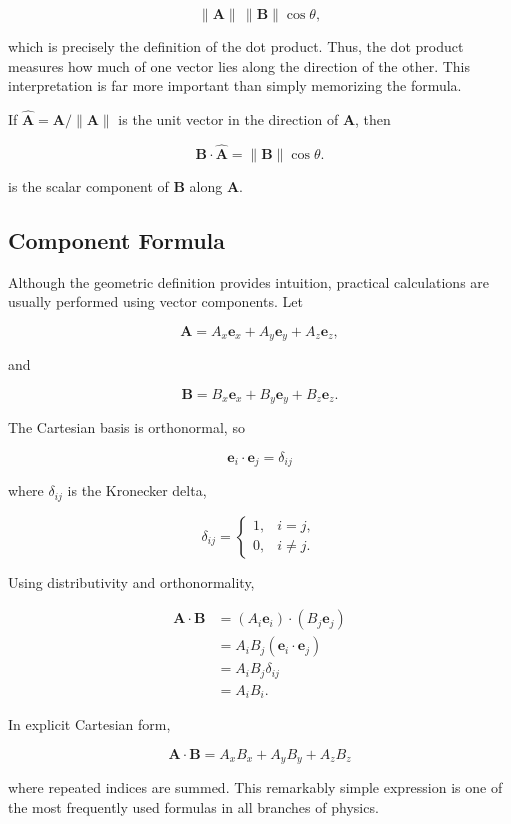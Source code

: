 \[
\lVert\mathbf A\rVert\,\lVert\mathbf B\rVert\cos\theta,
\]

which is precisely the definition of the dot product. Thus, the dot product
measures how much of one vector lies along the direction of the other. This
interpretation is far more important than simply memorizing the formula.

If $\widehat{\mathbf A}=\mathbf A/\lVert\mathbf A\rVert$ is the unit vector in
the direction of $\mathbf A$, then

\[
\mathbf B\cdot\widehat{\mathbf A}
=
\lVert\mathbf B\rVert\cos\theta.
\]

is the scalar component of $\mathbf B$ along $\mathbf A$.

\subsection{Component Formula}

Although the geometric definition provides intuition, practical calculations
are usually performed using vector components. Let

\[
\mathbf A
=A_x\mathbf e_x+A_y\mathbf e_y+A_z\mathbf e_z,
\]

and

\[
\mathbf B
=B_x\mathbf e_x+B_y\mathbf e_y+B_z\mathbf e_z.
\]

The Cartesian basis is orthonormal, so

\[
\boxed{
\mathbf e_i\cdot\mathbf e_j=\delta_{ij}
}
\]

where $\delta_{ij}$ is the Kronecker delta,

\[
\delta_{ij}
=
\begin{cases}
1, & i=j,\\
0, & i\neq j.
\end{cases}
\]

Using distributivity and orthonormality,

\begin{align*}
\mathbf A\cdot\mathbf B
&=
(A_i\mathbf e_i)\cdot(B_j\mathbf e_j)\\
&=
A_iB_j(\mathbf e_i\cdot\mathbf e_j)\\
&=
A_iB_j\delta_{ij}\\
&=
A_iB_i.
\end{align*}

In explicit Cartesian form,

\[
\boxed{
\mathbf A\cdot\mathbf B
=
A_xB_x+A_yB_y+A_zB_z
}
\]

where repeated indices are summed. This remarkably simple expression is one of
the most frequently used formulas in all branches of physics.


